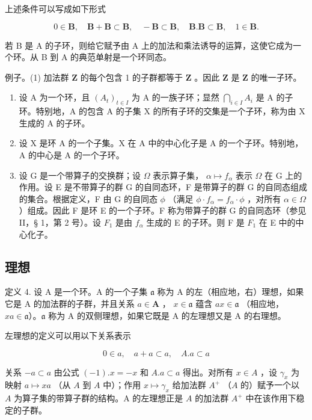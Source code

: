 上述条件可以写成如下形式

\[
0 \in \mathbf {B}, \quad \mathbf {B} + \mathbf {B} \subset \mathbf {B}, \quad - \mathbf {B} \subset \mathbf {B}, \quad \mathbf {B}. \mathbf {B} \subset \mathbf {B}, \quad 1 \in \mathbf {B}.
\]

若 B 是 A 的子环，则给它赋予由 A 上的加法和乘法诱导的运算，这使它成为一个环。从 B 到 A 的典范单射是一个环同态。

例子。(1) 加法群 \(\mathbf{Z}\) 的每个包含 1 的子群都等于 \(\mathbf{Z}\) 。因此 \(\mathbf{Z}\) 是 \(\mathbf{Z}\) 的唯一子环。

\begin{enumerate}
\def\labelenumi{(\arabic{enumi})}
\setcounter{enumi}{1}
\item
  设 A 为一个环，且 \((A_{t})_{t\in I}\) 为 A 的一族子环；显然 \(\bigcap_{i\in I}A_{i}\) 是 A 的子环。特别地，A 的包含 A 的子集 X 的所有子环的交集是一个子环，称为由 X 生成的 A 的子环。
\item
  设 X 是环 A 的一个子集。X 在 A 中的中心化子是 A 的一个子环。特别地，A 的中心是 A 的一个子环。
\item
  设 G 是一个带算子的交换群；设 \(\Omega\) 表示算子集， \(\alpha \mapsto f_{\alpha}\) 表示 \(\Omega\) 在 G 上的作用。设 E 是不带算子的群 G 的自同态环，F 是带算子的群 G 的自同态组成的集合。根据定义，F 由 G 的自同态 \(\phi\) （满足 \(\phi \cdot f_{\alpha} = f_{\alpha} \cdot \phi\) ，对所有 \(\alpha \in \Omega\) ）组成。因此 F 是环 E 的一个子环。F 称为带算子的群 G 的自同态环（参见 II，§ 1，第 2 号）。设 \(F_{1}\) 是由 \(f_{\alpha}\) 生成的 E 的子环。则 F 是 \(F_{1}\) 在 E 中的中心化子。
\end{enumerate}

\subsection{理想}

定义 4. 设 A 是一个环。A 的一个子集 \(\mathfrak{a}\) 称为 A 的左（相应地，右）理想，如果它是 A 的加法群的子群，并且关系 \(a \in \mathbf{A}\) ， \(x \in \mathfrak{a}\) 蕴含 \(ax \in \mathfrak{a}\) （相应地， \(xa \in \mathfrak{a}\)）。\(\mathfrak{a}\) 称为 A 的双侧理想，如果它既是 A 的左理想又是 A 的右理想。

左理想的定义可以用以下关系表示

\[
0 \in a, \quad a + a \subset a, \quad A. a \subset a
\]

关系 \(-a \subset a\) 由公式 \((-1).x = -x\) 和 \(A.a \subset a\) 得出。对所有 \(x \in A\) ，设 \(\gamma_x\) 为映射 \(a \mapsto xa\) （从 \(A\) 到 \(A\) 中）；作用 \(x \mapsto \gamma_x\) 给加法群 \(A^+\) （\(A\) 的）赋予一个以 \(A\) 为算子集的带算子群的结构。A 的左理想正是 \(A\) 的加法群 \(A^+\) 中在该作用下稳定的子群。


